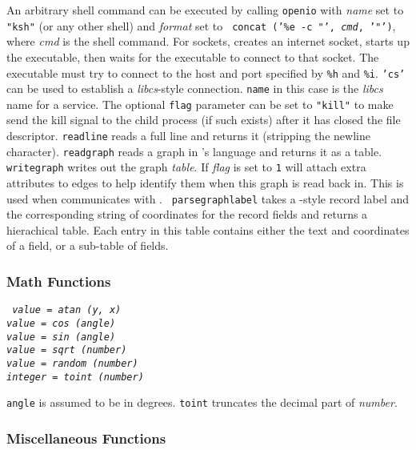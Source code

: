An arbitrary shell command can be executed by calling {\tt openio} with {\it
name} set to {\tt "ksh"} (or any other shell) and {\it format} set to {\tt
concat ('\%e -c "', {\it cmd}, '"')}, where {\it cmd} is the shell command.
For sockets, {\LEFTY} creates an internet socket, starts up the executable,
then waits for the executable to connect to that socket. The executable must
try to connect to the host and port specified by {\tt \%h} and {\tt \%i}.
{\tt 'cs'} can be used
to establish a {\it libcs}-style connection. {\tt name} in this case is the
{\it libcs} name for a service. The optional {\tt flag} parameter can be set to
{\tt "kill"} to make {\LEFTY} send the kill signal to the child process (if
such exists) after it has closed the file descriptor.  {\tt readline} reads a
full line and returns it (stripping the newline character). {\tt readgraph}
reads a graph in {\DOT}'s language and returns it as a table. {\tt writegraph}
writes out the graph {\it table}. If {\it flag} is set to {\tt 1} {\LEFTY}
will attach extra attributes to edges to help identify them when this graph
is read back in. This is used when {\LEFTY} communicates with {\DOT}. {\tt
parsegraphlabel} takes a {\DOT}-style record label and the corresponding string
of coordinates for the record fields and returns a hierachical table.  Each
entry in this table contains either the text and coordinates of a field, or a
sub-table of fields.

\subsubsection{Math Functions}

\begin{flushleft}\tt
\it value \tt = atan (\it y, x\tt )\\
\it value \tt = cos (\it angle\tt )\\
\it value \tt = sin (\it angle\tt )\\
\it value \tt = sqrt (\it number\tt )\\
\it value \tt = random (\it number\tt )\\
\it integer \tt = toint (\it number\tt )
\end{flushleft}\vspace{-2\itemsep}
{\tt angle} is assumed to be in degrees. {\tt toint} truncates the decimal part
of {\it number}.

\subsubsection{Miscellaneous Functions}

